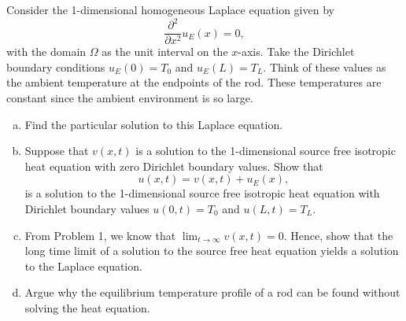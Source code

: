 \documentclass[12pt]{article} %
\begin{document}
\begin{problem}
    Consider the 1-dimensional homogeneous Laplace equation given by 
    \[
    \frac{\partial^2}{\partial x^2} u_E(x) = 0,
    \]
    with the domain $\Omega$ as the unit interval on the $x$-axis.  Take the Dirichlet boundary conditions $u_E(0)=T_0$ and $u_E(L)=T_L$.  Think of these values as the ambient temperature at the endpoints of the rod.  These temperatures are constant since the ambient environment is so large.
    \begin{enumerate}[(a)]
        \item Find the particular solution to this Laplace equation.
        \item Suppose that $v(x,t)$ is a solution to the 1-dimensional source free isotropic heat equation with zero Dirichlet boundary values. Show that 
        \[
        u(x,t)=v(x,t)+u_E(x),
        \]  
        is a solution to the 1-dimensional source free isotropic heat equation with Dirichlet boundary values $u(0,t)=T_0$ and $u(L,t)=T_L$.
        \item From Problem 1, we know that $\lim_{t\to \infty} v(x,t) = 0$.  Hence, show that the long time limit of a solution to the source free heat equation yields a solution to the Laplace equation.
        \item Argue why the equilibrium temperature profile of a rod can be found without solving the heat equation.
    \end{enumerate}
\end{problem}
\end{document}
